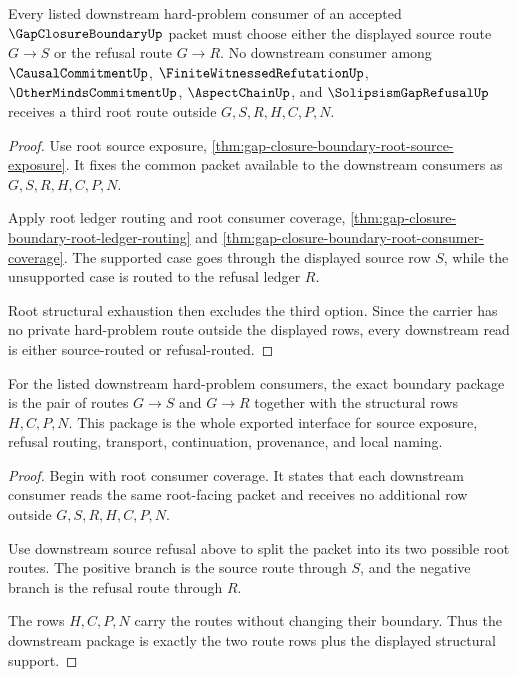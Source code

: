 \begin{theorem}
\label{thm:gap-closure-boundary-downstream-source-refusal}
Every listed downstream hard-problem consumer of an accepted $\GapClosureBoundaryUp$ packet must choose either the displayed source route $G \longrightarrow S$ or the refusal route $G \longrightarrow R$. No downstream consumer among $\CausalCommitmentUp$, $\FiniteWitnessedRefutationUp$, $\OtherMindsCommitmentUp$, $\AspectChainUp$, and $\SolipsismGapRefusalUp$ receives a third root route outside $G,S,R,H,C,P,N$.
\end{theorem}
\begin{proof}
Use root source exposure, \autoref{thm:gap-closure-boundary-root-source-exposure}. It fixes the common packet available to the downstream consumers as $G,S,R,H,C,P,N$.

Apply root ledger routing and root consumer coverage, \autoref{thm:gap-closure-boundary-root-ledger-routing} and \autoref{thm:gap-closure-boundary-root-consumer-coverage}. The supported case goes through the displayed source row $S$, while the unsupported case is routed to the refusal ledger $R$.

Root structural exhaustion then excludes the third option. Since the carrier has no private hard-problem route outside the displayed rows, every downstream read is either source-routed or refusal-routed.
\end{proof}

\begin{theorem}
\label{thm:gap-closure-boundary-downstream-boundary-package}
For the listed downstream hard-problem consumers, the exact boundary package is the pair of routes $G \longrightarrow S$ and $G \longrightarrow R$ together with the structural rows $H,C,P,N$. This package is the whole exported interface for source exposure, refusal routing, transport, continuation, provenance, and local naming.
\end{theorem}
\begin{proof}
Begin with root consumer coverage. It states that each downstream consumer reads the same root-facing packet and receives no additional row outside $G,S,R,H,C,P,N$.

Use downstream source refusal above to split the packet into its two possible root routes. The positive branch is the source route through $S$, and the negative branch is the refusal route through $R$.

The rows $H,C,P,N$ carry the routes without changing their boundary. Thus the downstream package is exactly the two route rows plus the displayed structural support.
\end{proof}

